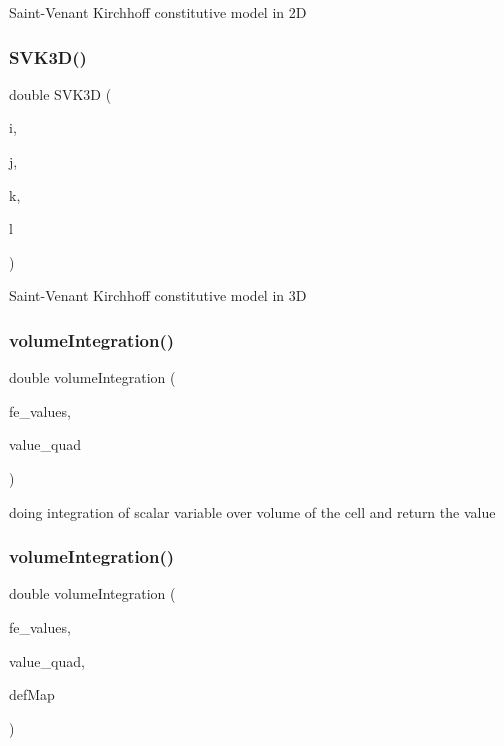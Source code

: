 Saint-\/\+Venant Kirchhoff constitutive model in 2D \mbox{\label{class_residual_a10e7144d5c4746f15a48d506830790cb}} 
\subsubsection{\texorpdfstring{SVK3D()}{SVK3D()}}
{\footnotesize\ttfamily double S\+V\+K3D (\begin{DoxyParamCaption}\item[{unsigned int}]{i,  }\item[{unsigned int}]{j,  }\item[{unsigned int}]{k,  }\item[{unsigned int}]{l }\end{DoxyParamCaption})}

Saint-\/\+Venant Kirchhoff constitutive model in 3D \mbox{\label{class_residual_a8ac0b75533aa9e599cc3c623e57fa5aa}} 
\subsubsection{\texorpdfstring{volumeIntegration()}{volumeIntegration()}\hspace{0.1cm}{\footnotesize\ttfamily [1/6]}}
{\footnotesize\ttfamily double volume\+Integration (\begin{DoxyParamCaption}\item[{const F\+E\+Values$<$ dim $>$ \&}]{fe\+\_\+values,  }\item[{double}]{value\+\_\+quad }\end{DoxyParamCaption})}

doing integration of scalar variable over volume of the cell and return the value \mbox{\label{class_residual_ad535764375d2690424b1545898b8a168}} 
\subsubsection{\texorpdfstring{volumeIntegration()}{volumeIntegration()}\hspace{0.1cm}{\footnotesize\ttfamily [2/6]}}
{\footnotesize\ttfamily double volume\+Integration (\begin{DoxyParamCaption}\item[{const F\+E\+Values$<$ dim $>$ \&}]{fe\+\_\+values,  }\item[{double}]{value\+\_\+quad,  }\item[{\mbox{\hyperlink{structdeformation_map}{deformation\+Map}}$<$ T, dim $>$ \&}]{def\+Map }\end{DoxyParamCaption})}

